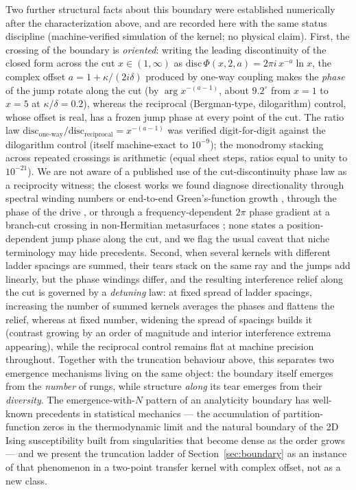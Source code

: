 \documentclass[11pt,a4paper]{article}
\begin{document}
Two further structural facts about this boundary were established
numerically after the characterization above, and are recorded here with
the same status discipline (machine-verified simulation of the kernel;
no physical claim). First, the crossing of the boundary is
\emph{oriented}: writing the leading discontinuity of the closed form
across the cut $x \in (1,\infty)$ as
$\mathrm{disc}\,\Phi(x,2,a) = 2\pi i\, x^{-a} \ln x$, the complex offset
$a = 1 + \kappa/(2i\delta)$ produced by one-way coupling makes the
\emph{phase} of the jump rotate along the cut (by
$\arg x^{-(a-1)}$, about $9.2^\circ$ from $x=1$ to $x=5$ at
$\kappa/\delta = 0.2$), whereas the reciprocal (Bergman-type,
dilogarithm) control, whose offset is real, has a frozen jump phase at
every point of the cut. The ratio law
$\mathrm{disc}_{\text{one-way}}/\mathrm{disc}_{\text{reciprocal}}
= x^{-(a-1)}$ was verified digit-for-digit against the dilogarithm
control (itself machine-exact to $10^{-9}$); the monodromy stacking
across repeated crossings is arithmetic (equal sheet steps, ratios equal
to unity to $10^{-21}$). We are not aware of a published use of the
cut-discontinuity phase law as a reciprocity witness; the closest works
we found diagnose directionality through spectral winding numbers or
end-to-end Green's-function growth \cite{HuWang2023}, through the phase
of the drive \cite{McDonald2018}, or through a frequency-dependent
$2\pi$ phase gradient at a branch-cut crossing in non-Hermitian
metasurfaces \cite{Colom2023}; none states a position-dependent jump
phase along the cut, and we flag the usual caveat that niche
terminology may hide precedents. Second, when several kernels with
different ladder spacings are summed, their tears stack on the same ray
and the jumps add linearly, but the phase windings differ, and the
resulting interference relief along the cut is governed by a
\emph{detuning} law: at fixed spread of ladder spacings, increasing the
number of summed kernels averages the phases and flattens the relief,
whereas at fixed number, widening the spread of spacings builds it
(contrast growing by an order of magnitude and interior interference
extrema appearing), while the reciprocal control remains flat at
machine precision throughout. Together with the truncation behaviour
above, this separates two emergence mechanisms living on the same
object: the boundary itself emerges from the \emph{number} of rungs,
while structure \emph{along} its tear emerges from their
\emph{diversity}. The emergence-with-$N$ pattern of an analyticity
boundary has well-known precedents in statistical mechanics --- the
accumulation of partition-function zeros in the thermodynamic limit
\cite{LeeYang1952} and the natural boundary of the 2D Ising
susceptibility built from singularities that become dense as the order
grows \cite{Nickel1999} --- and we present the truncation ladder of
Section~\ref{sec:boundary} as an instance of that phenomenon in a
two-point transfer kernel with complex offset, not as a new class.
\end{document}
